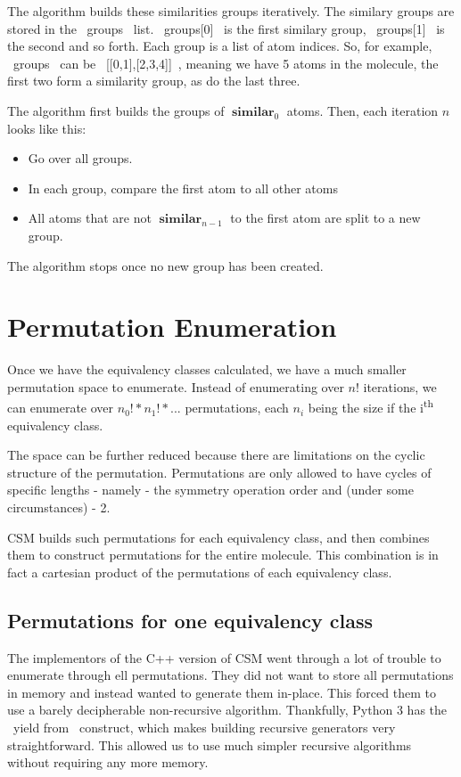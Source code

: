 \documentclass[]{article}
\DeclareMathOperator*{\similar}{\mathbf{similar}}
\begin{document}
The algorithm builds these similarities groups iteratively. The similary groups are stored in the ~groups~ list. ~groups[0]~ is the first similary group, ~groups[1]~ is the second and so forth. Each group is a list of atom indices. So, for example, ~groups~ can be ~[[0,1],[2,3,4]]~, meaning we have 5 atoms in the molecule, the first two form a similarity group, as do the last three.

The algorithm first builds the groups of $\similar_{0}$ atoms. Then, each iteration $n$ looks like this:
\begin{itemize}
	\item Go over all groups.
	\item In each group, compare the first atom to all other atoms
	\item All atoms that are not $\similar_{n-1}$ to the first atom are split to a new group.
\end{itemize}

The algorithm stops once no new group has been created.

\section{Permutation Enumeration}
Once we have the equivalency classes calculated, we have a much smaller permutation space to enumerate. Instead of enumerating over $n!$ iterations, we can enumerate over $n_0! * n_1! * ... $ permutations, each $n_{i}$ being the size if the i\textsuperscript{th} equivalency class.

The space can be further reduced because there are limitations on the cyclic structure of the permutation. Permutations are only allowed to have cycles of specific lengths - namely - the symmetry operation order and (under some circumstances) - 2. 

CSM builds such permutations for each equivalency class, and then combines them to construct permutations for the entire molecule. This combination is in fact a cartesian product of the permutations of each equivalency class.

\subsection{Permutations for one equivalency class}
The implementors of the C++ version of CSM went through a lot of trouble to enumerate through ell permutations. They did not want to store all permutations in memory and instead wanted to generate them in-place. This forced them to use a barely decipherable non-recursive algorithm. Thankfully, Python 3 has the ~yield from~ construct, which makes building recursive generators very straightforward. This allowed us to use much simpler recursive algorithms without requiring any more memory.
\end{document}
